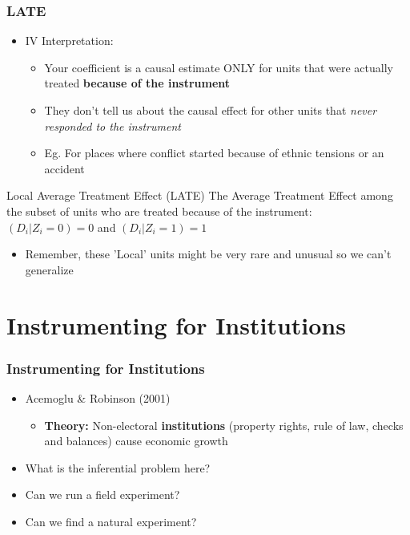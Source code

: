\documentclass[xcolor=x11names,compress]{beamer}\usepackage[]{graphicx}\usepackage[]{color}
\renewcommand{\(}{\begin{columns}}
\renewcommand{\)}{\end{columns}}
\newcommand{\<}[1]{\begin{column}{#1}}
\renewcommand{\>}{\end{column}}
\begin{document}
\begin{frame}
\frametitle{LATE}
\begin{itemize}
\item IV Interpretation:
\pause
\begin{itemize}
\item Your coefficient is a causal estimate ONLY for units that were actually treated \textbf{because of the instrument}
\pause
\item They don't tell us about the causal effect for other units that \textit{never responded to the instrument}
\pause
\item Eg. For places where conflict started because of ethnic tensions or an accident
\end{itemize}
\end{itemize}
\pause
\begin{block}{Local Average Treatment Effect (LATE)}
The Average Treatment Effect among the subset of units who are treated because of the instrument: \\
$(D_i|Z_i=0) = 0$ and $(D_i|Z_i=1) = 1$
\end{block}
\begin{itemize}
\pause
\item Remember, these 'Local' units might be very rare and unusual so we can't generalize
\end{itemize}
\end{frame}

\section{Instrumenting for Institutions}

\begin{frame}
\frametitle{Instrumenting for Institutions}
\begin{itemize}
\item Acemoglu \& Robinson (2001)
\begin{itemize}
\item \textbf{Theory:} Non-electoral \textbf{institutions} (property rights, rule of law, checks and balances) cause economic growth
\pause
\end{itemize}
\item What is the inferential problem here?
\pause
\item Can we run a field experiment?
\pause
\item Can we find a natural experiment?
\end{itemize}
\end{frame}
\end{document}
